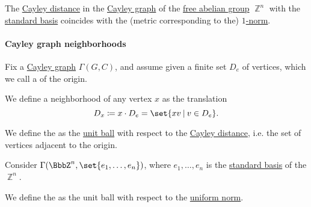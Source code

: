 \begin{proposition}\label{thm:cayley_distance_integer_lattice}
  The \hyperref[def:cayley_distance]{Cayley distance} in the \hyperref[def:cayley_graph]{Cayley graph} of the \hyperref[def:free_abelian_group]{free abelian group} \( \BbbZ^n \) with the \hyperref[def:coordinate_space]{standard basis} coincides with the (metric corresponding to the) \hyperref[def:p_norm]{\( 1 \)-norm}.
\end{proposition}

\paragraph{Cayley graph neighborhoods}

\begin{definition}\label{def:cayley_graph_neighborhood}
  Fix a \hyperref[def:cayley_graph]{Cayley graph} \( \Gamma(G, C) \), and assume given a finite set \( D_e \) of vertices, which we call a  of the origin.

  We define a neighborhood of any vertex \( x \) as the translation
  \begin{equation*}
    D_x \coloneqq x \cdot D_e = \set{ xv \given v \in D_e }.
  \end{equation*}

  \begin{thmenum}
     We define the  as the \hyperref[def:metric_space/ball]{unit ball} with respect to the \hyperref[def:cayley_distance]{Cayley distance}, i.e. the set of vertices adjacent to the origin.

     Consider \( \Gamma(\BbbZ^n, \set{ e_1, \ldots, e_n }) \), where \( e_1, \ldots, e_n \) is the \hyperref[def:coordinate_space]{standard basis} of the \hyperref[def:free_abelian_group]{\( \BbbZ^n \)}.

    We define the  as the unit ball with respect to the \hyperref[def:p_norm]{uniform norm}.
  \end{thmenum}
\end{definition}

